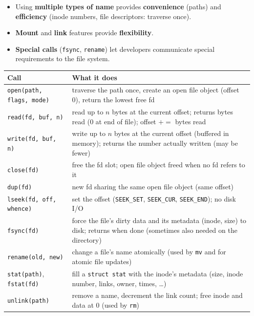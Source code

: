 \documentclass[11pt,a4paper]{article}
\begin{document}
\begin{keybox}
\begin{itemize}
  \item Using \textbf{multiple types of name} provides
        \textbf{convenience} (paths) and \textbf{efficiency} (inode numbers,
        file descriptors: traverse once).
  \item \textbf{Mount} and \textbf{link} features provide
        \textbf{flexibility}.
  \item \textbf{Special calls} (\texttt{fsync}, \texttt{rename}) let
        developers communicate special requirements to the file system.
\end{itemize}
\end{keybox}

\begin{center}
\small
\renewcommand{\arraystretch}{1.15}
\begin{tabularx}{\textwidth}{@{}lX@{}}
  \toprule
  \textbf{Call} & \textbf{What it does} \\
  \midrule
  \texttt{open(path, flags, mode)} & traverse the path once, create an open file object (offset 0), return the lowest free fd \\
  \texttt{read(fd, buf, n)} & read up to \(n\) bytes at the current offset; returns bytes read (0 at end of file); offset \(+=\) bytes read \\
  \texttt{write(fd, buf, n)} & write up to \(n\) bytes at the current offset (buffered in memory); returns the number actually written (may be fewer) \\
  \texttt{close(fd)} & free the fd slot; open file object freed when no fd refers to it \\
  \texttt{dup(fd)} & new fd sharing the same open file object (same offset) \\
  \texttt{lseek(fd, off, whence)} & set the offset (\texttt{SEEK\_SET}, \texttt{SEEK\_CUR}, \texttt{SEEK\_END}); no disk I/O \\
  \texttt{fsync(fd)} & force the file's dirty data and its metadata (inode, size) to disk; returns when done (sometimes also needed on the directory) \\
  \texttt{rename(old, new)} & change a file's name atomically (used by \texttt{mv} and for atomic file updates) \\
  \texttt{stat(path)}, \texttt{fstat(fd)} & fill a \texttt{struct stat} with the inode's metadata (size, inode number, links, owner, times, \ldots) \\
  \texttt{unlink(path)} & remove a name, decrement the link count; free inode and data at 0 (used by \texttt{rm}) \\

\end{tabularx}
\end{center}
\end{document}
